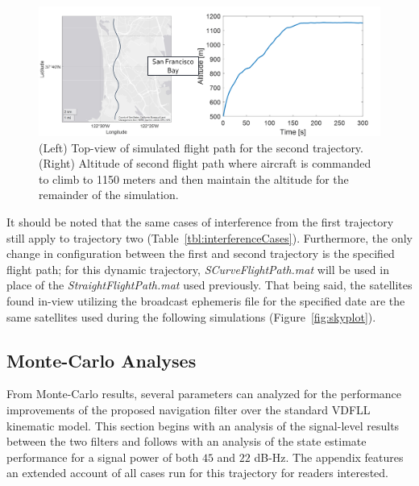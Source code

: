 \begin{figure}[!ht]
    \centering
    \includegraphics[width=\linewidth]{Figures/Results/trajectory2.png}
    \caption{(Left) Top-view of simulated flight path for the second trajectory. (Right) Altitude of second flight path where aircraft is commanded to climb to 1150 meters and then maintain the altitude for the remainder of the simulation.}\label{fig:trajectory2}
\end{figure}

It should be noted that the same cases of interference from the first trajectory still apply to trajectory two (Table~\ref{tbl:interferenceCases}). Furthermore, the only change in configuration between the first and second trajectory is the specified flight path; for this dynamic trajectory, \textit{SCurveFlightPath.mat} will be used in place of the \textit{StraightFlightPath.mat} used previously. That being said, the satellites found in-view utilizing the broadcast ephemeris file for the specified date are the same satellites used during the following simulations (Figure~\ref{fig:skyplot}).

\clearpage
\subsection{\textbf{Monte-Carlo Analyses}}
From Monte-Carlo results, several parameters can analyzed for the performance improvements of the proposed navigation filter over the standard VDFLL kinematic model. This section begins with an analysis of the signal-level results between the two filters and follows with an analysis of the state estimate performance for a signal power of both \(45\) and \(22\) dB-Hz. The appendix features an extended account of all cases run for this trajectory for readers interested.

